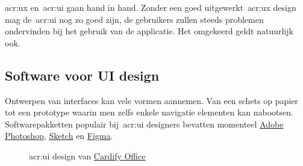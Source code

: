 \acrfull{acr:ux} en~\acrfull{acr:ui} gaan hand in hand. Zonder een goed uitgewerkt~\acrshort{acr:ux} design mag de~\acrshort{acr:ui} nog zo goed zijn, de gebruikers zullen steeds problemen ondervinden bij het gebruik van de applicatie. Het omgekeerd geldt natuurlijk ook.

\subsection{Software voor UI design}
\label{sec:ux-vs-ui:software}

Ontwerpen van interfaces kan vele vormen aannemen. Van een schets op papier tot een prototype waarin men zelfs enkele navigatie elementen kan nabootsen. Softwarepakketten populair bij~\acrshort{acr:ui} designers bevatten momenteel \href{https://www.adobe.com/products/photoshop.html}{Adobe Photoshop}, \href{https://www.sketch.com/}{Sketch} en \href{https://www.figma.com/}{Figma}.

\begin{figure}[h!]
    \centering
    \qquad
    \caption[Voorbeeld \acrshort{acr:ui}-designproces]{\acrshort{acr:ui} design van \href{https://office.getcardify.com/}{Cardify Office}}
    \label{fig:ux-vs-ui:software}
\end{figure}
